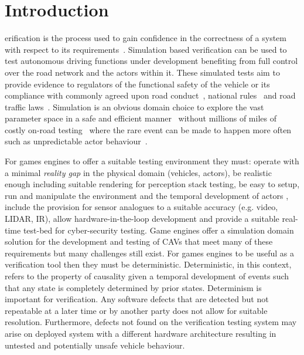 

\section{Introduction} \label{s:introduction}

erification is the process used to gain confidence in the correctness of a system with respect to its requirements~\cite{bergeron2012writing}. Simulation based verification can be used to test autonomous driving functions under development benefiting from full control over the road network and the actors within it. These simulated tests aim to provide evidence to regulators of the functional safety of the vehicle or its compliance with commonly agreed upon road conduct~\cite{ViennaConv}, national rules~\cite{codes2015highway} and road traffic laws~\cite{RoadTraffic1988}. Simulation is an obvious domain choice to explore the vast parameter space in a safe and efficient manner~\cite{korosec2019waymo} without millions of miles of costly on-road testing~\cite{kalra2016driving} where the rare event can be made to happen more often~\cite{Koopman2018} such as unpredictable actor behaviour~\cite{RobustnessAutonomy}. 

For games engines to offer a suitable testing environment they must: operate with a minimal \textit{reality gap} in the physical domain (vehicles, actors), be realistic enough \cite{koopman realistic enough} including suitable rendering for perception stack testing, be easy to setup, run and manipulate the environment and the temporal development of actors \cite{Ulbrich2015.}, include the provision for sensor analogues to a suitable accuracy (e.g. video, LIDAR, IR), allow hardware-in-the-loop development and provide a suitable real-time test-bed for cyber-security testing.
%
Game engines offer a simulation domain solution for the development and testing of CAVs that meet many of these requirements but many challenges still exist.
%
For games engines to be useful as a verification tool then they must be deterministic. 
%
Deterministic, in this context, refers to the property of causality given a temporal development of events such that any state is completely determined by prior states.
%
Determinism is important for verification. Any software defects that are detected but not repeatable at a later time or by another party does not allow for suitable resolution. Furthermore, defects not found on the verification testing system may arise on deployed system with a different hardware architecture resulting in untested and potentially unsafe vehicle behaviour.

